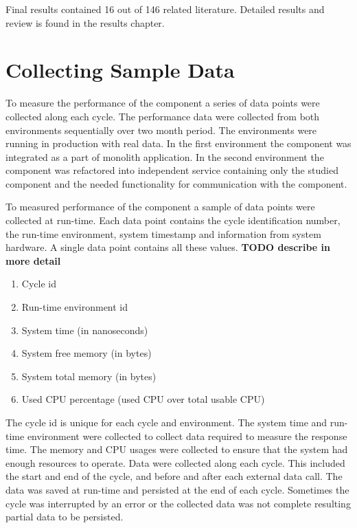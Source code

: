 Final results contained 16 out of 146 related literature.
Detailed results and review is found in the results chapter.

\section{Collecting Sample Data}
To measure the performance of the component a series of data points were collected along each cycle.
The performance data were collected from both environments sequentially over two month period.
The environments were running in production with real data.
In the first environment the component was integrated as a part of monolith application.
In the second environment the component was refactored into independent service containing only the studied component and the needed functionality for communication with the component.

To measured performance of the component a sample of data points were collected at run-time.
Each data point contains the cycle identification number, the run-time environment, system timestamp and information from system hardware.
A single data point contains all these values.
\textbf{TODO describe in more detail}
\begin{enumerate}
    \item Cycle id
    \item Run-time environment id
    \item System time (in nanoseconds)
    \item System free memory (in bytes)
    \item System total memory (in bytes)
    \item Used CPU percentage (used CPU over total usable CPU)
\end{enumerate}

The cycle id is unique for each cycle and environment.
The system time and run-time environment were collected to collect data required to measure the response time.
The memory and CPU usages were collected to ensure that the system had enough resources to operate.
Data were collected along each cycle.
This included the start and end of the cycle, and before and after each external data call.
The data was saved at run-time and persisted at the end of each cycle.
Sometimes the cycle was interrupted by an error or the collected data was not complete resulting partial data to be persisted.
